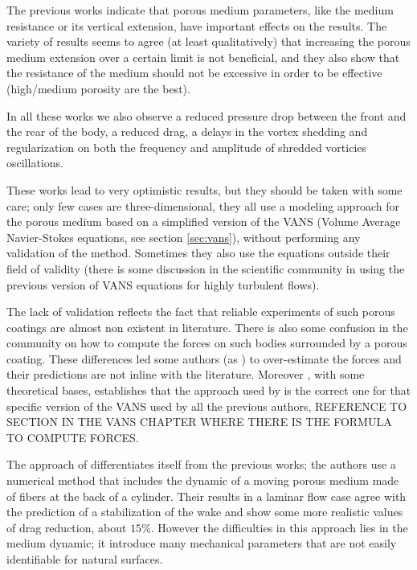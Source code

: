 The previous works indicate that porous medium parameters, like the medium resistance or its vertical extension, have important effects on the results.
The variety of results seems to agree (at least qualitatively) that increasing the porous medium extension over a certain limit is not beneficial, and they also show that the resistance of the medium should not be excessive in order to be effective (high/medium porosity are the best).

In all these works we also observe a reduced pressure drop between the front and the rear of the body, a reduced drag, a delays in the vortex shedding and regularization on both the frequency and amplitude of shredded vorticies oscillations.

These works lead to very optimistic results, but they should be taken with some care; only few cases are three-dimensional, they all use a modeling approach for the porous medium based on a simplified version of the VANS (Volume Average Navier-Stokes equations, see section \ref{sec:vans}), without performing any validation of the method.
Sometimes they also use the equations outside their field of validity (there is some discussion in the scientific community in using the previous version of VANS equations for highly turbulent flows).

The lack of validation reflects the fact that reliable experiments of such porous coatings are almost non existent in literature.
There is also some confusion in the community on how to compute the forces on such bodies surrounded by a porous coating. These differences led some authors (as \citet{naito2012numerical}) to over-estimate the forces and their predictions are not inline with the literature.
Moreover \citet{caltagirone1994interaction}, with some theoretical bases, establishes that the approach used by \citet{bruneau2004passive} is the correct one for that specific version of the VANS used by all the previous authors, REFERENCE TO SECTION IN THE VANS CHAPTER WHERE THERE IS THE FORMULA TO COMPUTE FORCES.

The approach of \citet{favier2009passive} differentiates itself from the previous works; the authors use a numerical method that includes the dynamic of a moving porous medium made of fibers at the back of a cylinder.
Their results in a laminar flow case agree with the prediction of a stabilization of the wake and show some more realistic values of drag reduction, about $15\%$.
However the difficulties in this approach lies in the medium dynamic; it introduce many mechanical parameters that are not easily identifiable for natural surfaces.

